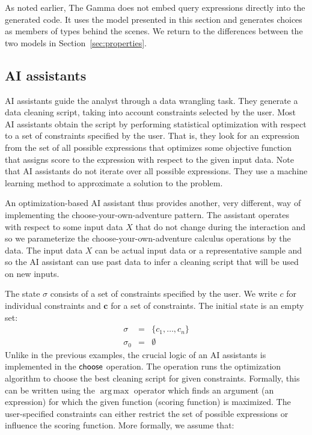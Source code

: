\documentclass[ a4paper,UKenglish,cleveref, autoref, thm-restate]{lipics-v2021}
\newcommand{\ident}[1]{\textsf{#1}}
\newcommand{\sigmaN}{\sigma_0}
\newcommand{\select}{\textnormal{\ident{choose}}}
\DeclareMathOperator{\argmax}{arg\,max}
\begin{document}
As noted earlier, The Gamma does not embed query expressions directly into the generated code.
It uses the model presented in this section and generates choices as members of
types behind the scenes. We return to the differences between the two models in
Section~\ref{sec:properties}.


\subsection{AI assistants}
\label{sec:examples-aias}

AI assistants guide the analyst through a data wrangling task. They
generate a data cleaning script, taking into account constraints selected by the user.
Most AI assistants obtain the script by performing statistical optimization with respect
to a set of constraints specified by the user. That is, they look for an expression from the
set of all possible expressions that optimizes some objective function that assigns score to
the expression with respect to the given input data. Note that AI assistants do not iterate
over all possible expressions. They use a machine learning method to approximate a solution
to the problem.

An optimization-based AI assistant \cite{petricek-2023-aias} thus provides another, very
different, way of implementing the choose-your-own-adventure pattern. The assistant operates
with respect to some input data $X$ that do not change during the interaction and so we
parameterize the choose-your-own-adventure calculus operations by the data.
The input data $X$ can be actual input data or a representative sample and so the AI assistant
can use past data to infer a cleaning script that will be used on new inputs.

The state $\sigma$ consists of a set of constraints specified by the user. We write
$c$ for individual constraints and $\boldsymbol{c}$ for a set of constraints. The initial
state is an empty set:
\[
\begin{array}{rcl}
\sigma &=& \{ c_1, \ldots, c_n \}\\
\sigmaN &=& \emptyset
\end{array}
\]
Unlike in the previous examples, the crucial logic of an AI assistants is implemented in the
$\select$ operation. The operation runs the optimization algorithm to choose the best cleaning
script for given constraints. Formally, this can be written using the $\argmax$ operator which
finds an argument (an expression) for which the given function (scoring function) is maximized.
The user-specified constraints can either restrict the set of possible expressions or influence
the scoring function. More formally, we assume that:
\end{document}
